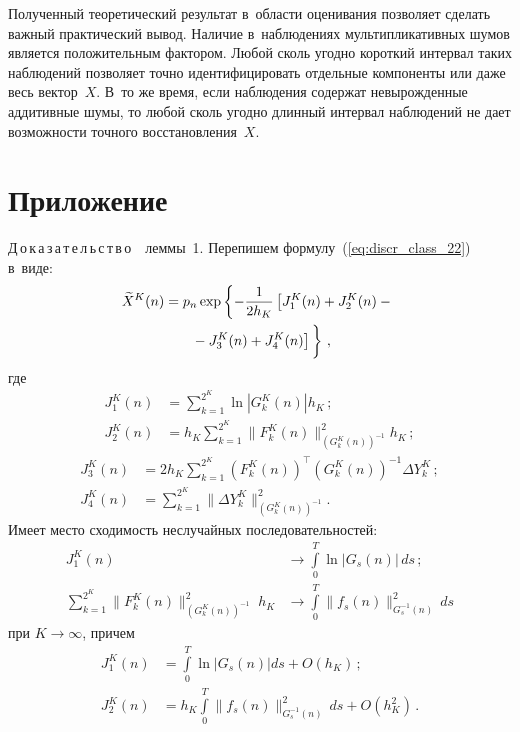 \begin{multicols}{2}
Полученный теоретический результат в~области оценивания позволяет сделать 
важный практический вывод. Наличие в~наблюдениях мультипликативных шумов 
является положительным фактором. Любой сколь угодно короткий интервал таких 
наблюдений позволяет точно идентифицировать отдельные компоненты или даже 
весь вектор~$X$. В~то же время, если наблюдения содержат не\-вы\-рож\-ден\-ные 
аддитивные шумы, то любой сколь угодно длинный интервал наблюдений не дает 
воз\-мож\-ности точного восстановления~$X$.

{\small \section*{\raggedleft Приложение}
 
 
 \noindent
Д\,о\,к\,а\,з\,а\,т\,е\,л\,ь\,с\,т\,в\,о\ \ леммы~1.
 Перепишем формулу~(\ref{eq:discr_class_22}) в~виде:
 \begin{multline}
   \widetilde{X}^K(n) =  p_n\exp\left\{
  -\fr{1}{2h_K}\left[
  J_1^K(n) + J_2^K(n) -{}\right.\right.\\
\left.\left.  {}- J_3^K(n) + J_4^K(n)
 \right]
  \vphantom{\fr{1}{2h_K}}
  \right\}\,,
  \label{eq:discr_class_2}
 \end{multline}
 где
 \begin{align*}
 J_1^K(n) &=  \displaystyle\sum\limits_{k=1}^{2^K} \ln|G_k^K(n)|h_K\,;\\
 J_2^K(n) &=  \displaystyle h_K\sum\limits_{k=1}^{2^K} \|F_k^K(n)\|^2_{\left(G_k^K(n)\right)^{-1}}h_K\,;
  \end{align*}
  \begin{align*}
 J_3^K(n) &=  \displaystyle 2h_K\sum\limits_{k=1}^{2^K} (F_k^K(n))^{\top}\left(G_k^K(n)\right)^{-1}\Delta Y^K_k\,;\\
 J_4^K(n) &=  \displaystyle \sum\limits_{k=1}^{2^K}\|\Delta Y^K_k\|^2_{\left(G_k^K(n)\right)^{-1}}.
 \end{align*}
 Имеет место сходимость неслучайных последовательностей:
 \begin{align*}
 J_1^K(n) &\to \int\limits_0^T \ln\left\vert G_s(n)\right\vert\,ds\,;
 \\
 \sum\limits_{k=1}^{2^K} \|F_k^K(n)\|^2_{\left(G_k^K(n)\right)^{-1}}\;
 h_K &\to \int\limits_0^T \|f_s(n)\|^2_{  G_s^{-1}(n)}\,ds
\end{align*}
 при $K \to \infty$, причем
 \begin{align*}
  J_1^K(n) &= \int\limits_0^T \ln|G_s(n)|ds + O(h_K)\,;
 \\
  J_2^K(n) &= h_K\int\limits_0^T \|f_s(n)\|^2_{  G_s^{-1}(n)}\,ds + O(h^2_K)\,.
 \end{align*}

}
\end{multicols}
